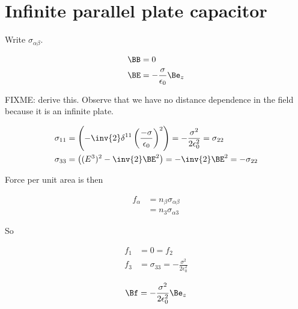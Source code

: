 %
%

\section{Infinite parallel plate capacitor}

Write $\sigma_{\alpha\beta}$.

\begin{equation}\label{eqn:relativisticElectrodynamicsT9:350}
\begin{aligned}
\BB &= 0  \\
\BE &= - \frac{\sigma}{\epsilon_0} \Be_z
\end{aligned}
\end{equation}

FIXME: derive this.  Observe that we have no distance dependence in the field because it is an infinite plate.

\begin{equation}\label{eqn:relativisticElectrodynamicsT9:370}
\begin{aligned}
\sigma_{1 1} &= \left( - \inv{2} \delta^{1 1} \left( \frac{-\sigma}{\epsilon_0} \right)^2 \right) = - \frac{ \sigma^2}{ 2 \epsilon_0^2 } = \sigma_{22} \\
\sigma_{3 3} &= \left( (E^3)^2 - \inv{2} \BE^2 \right)  = - \inv{2} \BE^2 = - \sigma_{2 2}
\end{aligned}
\end{equation}

Force per unit area is then

\begin{equation}\label{eqn:relativisticElectrodynamicsT9:900}
\begin{aligned}
f_\alpha 
&= n_\beta \sigma_{\alpha \beta} \\
&= n_3 \sigma_{\alpha 3}
\end{aligned}
\end{equation}

So 

\begin{equation}\label{eqn:relativisticElectrodynamicsT9:390}
\begin{aligned}
f_1 &= 0 = f_2 \\
f_3 &= \sigma_{3 3} = -\frac{\sigma^2}{2 \epsilon_0^2}
\end{aligned}
\end{equation}

\begin{equation}\label{eqn:relativisticElectrodynamicsT9:410}
\Bf = -\frac{\sigma^2}{2 \epsilon_0^2} \Be_z
\end{equation}
